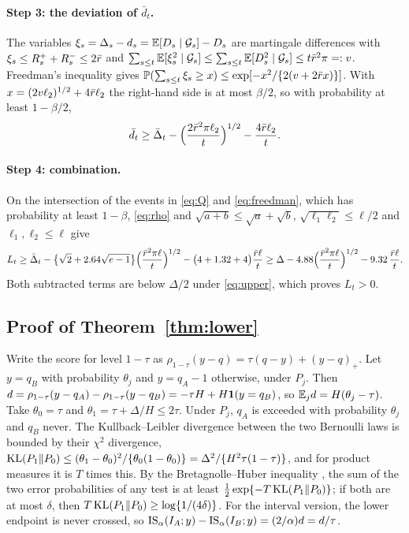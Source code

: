 \paragraph{Step 3: the deviation of $\bar d_t$.}
The variables $\xi_s=\Delta_s-d_s=\mathbb{E}[D_s\mid\mathcal{G}_s]-D_s$ are martingale
differences with $\xi_s\le R_s^++R_s^-\le2\bar r$ and
$\sum_{s\le t}\mathbb{E}[\xi_s^2\mid\mathcal{G}_s]\le\sum_{s\le t}\mathbb{E}[D_s^2\mid\mathcal{G}_s]\le
t\bar r^2\pi=:v$. Freedman's inequality \citep{freedman1975tail} gives
$\mathbb{P}(\sum_{s\le t}\xi_s\ge x)\le\exp[-x^2/\{2(v+2\bar r x)\}]$. With
$x=(2v\ell_2)^{1/2}+4\bar r\ell_2$ the right-hand side is at most
$\beta/2$, so with probability at least $1-\beta/2$,
\begin{equation}
 \bar d_t\ge\bar\Delta_t-\Bigl(\frac{2\bar r^2\pi\ell_2}{t}\Bigr)^{1/2}
 -\frac{4\bar r\ell_2}{t}.
 \label{eq:freedman}
\end{equation}

\paragraph{Step 4: combination.}
On the intersection of the events in \eqref{eq:Q} and
\eqref{eq:freedman}, which has probability at least $1-\beta$,
\eqref{eq:rho} and $\sqrt{a+b}\le\sqrt a+\sqrt b$,
$\sqrt{\ell_1\ell_2}\le\ell/2$ and $\ell_1,\ell_2\le\ell$ give
\[
 L_t\ge\bar\Delta_t-\bigl\{\sqrt2+2.64\sqrt{e-1}\bigr\}
 \Bigl(\frac{\bar r^2\pi\ell}{t}\Bigr)^{1/2}
 -\bigl(4+1.32+4\bigr)\frac{\bar r\ell}{t}
 \ge\Delta-4.88\Bigl(\frac{\bar r^2\pi\ell}{t}\Bigr)^{1/2}-9.32\,\frac{\bar r\ell}{t}.
\]
Both subtracted terms are below $\Delta/2$ under \eqref{eq:upper}, which
proves $L_t>0$.

\subsection{Proof of Theorem~\ref{thm:lower}}

Write the score for level $1-\tau$ as
$\rho_{1-\tau}(y-q)=\tau(q-y)+(y-q)_+$. Let $y=q_B$ with probability
$\theta_j$ and $y=q_A-1$ otherwise, under $P_j$. Then
$d=\rho_{1-\tau}(y-q_A)-\rho_{1-\tau}(y-q_B)=-\tau H+H\mathbf{1}(y=q_B)$, so
$\mathbb{E}_jd=H(\theta_j-\tau)$. Take $\theta_0=\tau$ and $\theta_1=\tau+\Delta/H\le2\tau$.
Under $P_j$, $q_A$ is exceeded with probability $\theta_j$ and $q_B$ never.
The Kullback--Leibler divergence between the two Bernoulli laws is bounded
by their $\chi^2$ divergence,
$\operatorname{KL}(P_1\|P_0)\le(\theta_1-\theta_0)^2/\{\theta_0(1-\theta_0)\}
=\Delta^2/\{H^2\tau(1-\tau)\}$, and for product measures it is $T$ times
this. By the Bretagnolle--Huber inequality
\citep[Lemma~2.6]{tsybakov2009introduction}, the sum of the two error
probabilities of any test is at least $\frac12\exp\{-T\operatorname{KL}(P_1\|P_0)\}$; if
both are at most $\delta$, then $T\operatorname{KL}(P_1\|P_0)\ge\log\{1/(4\delta)\}$. For
the interval version, the lower endpoint is never crossed, so
$\mathrm{IS}_\alpha(I_A;y)-\mathrm{IS}_\alpha(I_B;y)=(2/\alpha)d=d/\tau$.


